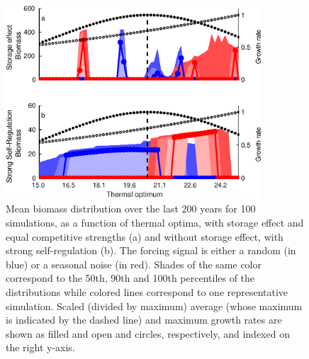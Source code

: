 \documentclass[smallcondensed,referee]{svjour3}       %
\begin{document}
\begin{figure}[!ht]
\begin{centering}
\includegraphics[bb=0bp 0bp 428bp 338bp,width=0.85\textwidth]{Fig4}
\par\end{centering}
\caption{Mean biomass distribution over the last 200 years for 100 simulations,
as a function of thermal optima, with storage effect and equal competitive
strengths (a) and without storage effect, with strong self-regulation
(b). The forcing signal is either a random (in blue) or a seasonal
noise (in red). Shades of the same color correspond to the 50th, 90th
and 100th percentiles of the distributions while colored lines correspond
to one representative simulation. Scaled (divided by maximum) average
(whose maximum is indicated by the dashed line) and maximum growth
rates are shown as filled and open and circles, respectively, and
indexed on the right y-axis. \label{fig:Unstable_cases}}
\end{figure}
\end{document}
